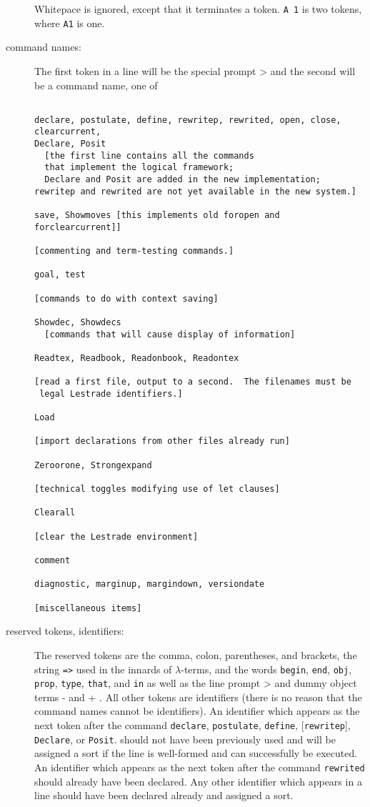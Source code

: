 \documentclass[12pt]{article}
\begin{document}
\begin{description}
\begin{enumerate}
\end{enumerate}

Whitepace is ignored, except that it terminates a token.  {\tt A 1} is two tokens, where {\tt A1} is one.

\item[command names:]  The first token in a line will be the special prompt \verb >>>  and the second will be a command name, one of

     \begin{verbatim}

declare, postulate, define, rewritep, rewrited, open, close, clearcurrent,
Declare, Posit  
  [the first line contains all the commands 
  that implement the logical framework;
  Declare and Posit are added in the new implementation;
rewritep and rewrited are not yet available in the new system.]

save, Showmoves [this implements old foropen and forclearcurrent]]

[commenting and term-testing commands.]

goal, test

[commands to do with context saving]

Showdec, Showdecs
  [commands that will cause display of information]

Readtex, Readbook, Readonbook, Readontex

[read a first file, output to a second.  The filenames must be
 legal Lestrade identifiers.]

Load

[import declarations from other files already run]

Zeroorone, Strongexpand

[technical toggles modifying use of let clauses]

Clearall

[clear the Lestrade environment]

comment

diagnostic, marginup, margindown, versiondate

[miscellaneous items]

\end{verbatim}

\item[reserved tokens, identifiers:]  The reserved tokens are the comma, colon, parentheses, and brackets, the string {\tt =>} used in the innards of $\lambda$-terms, and the words {\tt begin}, {\tt end}, {\tt obj}, {\tt prop}, {\tt type}, {\tt that}, and {\tt in} as well as the line prompt \verb >>>  and dummy object terms \verb ---  and \verb +++ .   All other
tokens are identifiers (there is no reason that the command names cannot be identifiers).  An identifier which appears as the next token after the command {\tt declare}, {\tt postulate}, {\tt define}, [{\tt rewritep}], {\tt Declare}, or {\tt Posit}. should not have been previously
used and will be assigned a sort if the line is well-formed and can successfully be executed.   An identifier which appears as the next token after the command {\tt rewrited}  should already have been declared.  Any other identifier which appears in a line should have been declared already
and assigned a sort.


\end{description}
\end{document}
